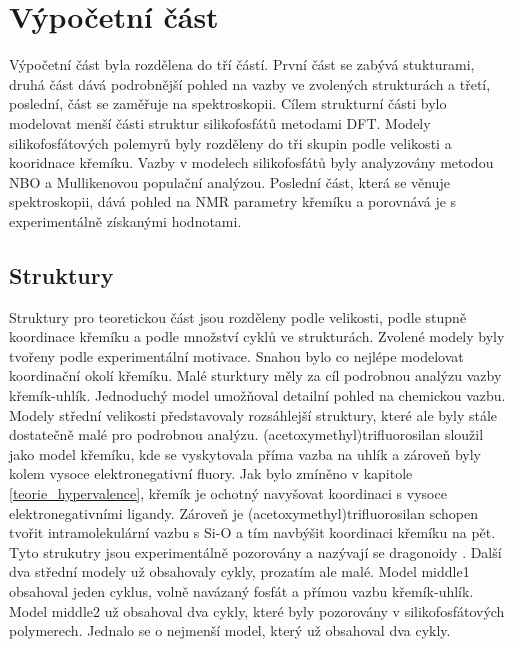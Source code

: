 \documentclass[
  digital, %
  table,   %
  lof,     %
  lot,     %
]{fithesis3}
\begin{document}
\section{Výpočetní část}
Výpočetní část byla rozdělena do tří částí. První část se zabývá stukturami, druhá část dává podrobnější pohled na vazby ve zvolených strukturách a třetí, poslední, část se zaměřuje na spektroskopii.
Cílem strukturní části bylo modelovat menší části struktur silikofosfátů metodami DFT. Modely silikofosfátových polemyrů byly rozděleny do tři skupin podle velikosti a kooridnace křemíku. Vazby v modelech silikofosfátů byly analyzovány metodou NBO a Mullikenovou populační analýzou. Poslední část, která se věnuje spektroskopii, dává pohled na NMR parametry křemíku a porovnává je s experimentálně získanými hodnotami.

\subsection{Struktury}
Struktury pro teoretickou část jsou rozděleny podle velikosti, podle stupně koordinace křemíku a podle množství cyklů ve strukturách. Zvolené modely byly tvořeny podle experimentální motivace. Snahou bylo co nejlépe modelovat koordinační okolí křemíku. Malé sturktury měly za cíl podrobnou analýzu vazby křemík-uhlík. Jednoduchý model umožňoval detailní pohled na chemickou vazbu.\\

Modely střední velikosti představovaly rozsáhlejší struktury, které ale byly stále dostatečně malé pro podrobnou analýzu. (acetoxymethyl)trifluorosilan sloužil jako model křemíku, kde se vyskytovala příma vazba na uhlík a zároveň byly kolem vysoce elektronegativní fluory. Jak bylo zmíněno v kapitole \ref{teorie_hypervalence}, křemík je ochotný navyšovat koordinaci s vysoce elektronegativními ligandy. Zároveň je (acetoxymethyl)trifluorosilan schopen tvořit intramolekulární vazbu s Si-O a tím navbýšit koordinaci křemíku na pět. Tyto strukutry jsou experimentálně pozorovány a nazývají se dragonoidy \cite{Chipanina2011}. Další dva střední modely už obsahovaly cykly, prozatím ale malé. Model middle1  obsahoval jeden cyklus, volně navázaný fosfát a přímou vazbu křemík-uhlík. Model middle2  už obsahoval dva cykly, které byly pozorovány v silikofosfátových polymerech. Jednalo se o nejmenší model, který už obsahoval dva cykly.\\
\end{document}
